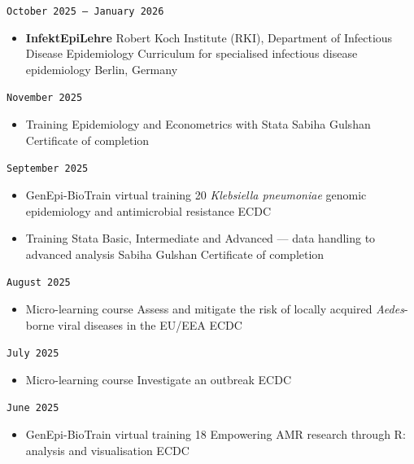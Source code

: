 \documentclass[
  10.5pt,
  a4paper,
  DIV=11,
  numbers=noendperiod]{scrartcl}
\providecommand{\tightlist}{%
  \setlength{\itemsep}{0pt}\setlength{\parskip}{0pt}}
\let\oldtexttt\texttt
\renewcommand{\texttt}[1]{{\color{cvbronze}\small\oldtexttt{#1}}}
\begin{document}
\texttt{October\ 2025\ –\ January\ 2026}

\begin{itemize}
\tightlist
\item
  \textbf{InfektEpiLehre} \textbar{} Robert Koch Institute (RKI),
  Department of Infectious Disease Epidemiology \textbar{} Curriculum
  for specialised infectious disease epidemiology \textbar{} Berlin,
  Germany
\end{itemize}

\texttt{November\ 2025}

\begin{itemize}
\tightlist
\item
  Training \textbar{} Epidemiology and Econometrics with Stata
  \textbar{} Sabiha Gulshan \textbar{} Certificate of completion
\end{itemize}

\texttt{September\ 2025}

\begin{itemize}
\tightlist
\item
  GenEpi-BioTrain virtual training 20 \textbar{} \emph{Klebsiella
  pneumoniae} genomic epidemiology and antimicrobial resistance
  \textbar{} ECDC
\item
  Training \textbar{} Stata Basic, Intermediate and Advanced --- data
  handling to advanced analysis \textbar{} Sabiha Gulshan \textbar{}
  Certificate of completion
\end{itemize}

\texttt{August\ 2025}

\begin{itemize}
\tightlist
\item
  Micro-learning course \textbar{} Assess and mitigate the risk of
  locally acquired \emph{Aedes}-borne viral diseases in the EU/EEA
  \textbar{} ECDC
\end{itemize}

\texttt{July\ 2025}

\begin{itemize}
\tightlist
\item
  Micro-learning course \textbar{} Investigate an outbreak \textbar{}
  ECDC
\end{itemize}

\texttt{June\ 2025}

\begin{itemize}
\tightlist
\item
  GenEpi-BioTrain virtual training 18 \textbar{} Empowering AMR research
  through R: analysis and visualisation \textbar{} ECDC
\end{itemize}
\end{document}
